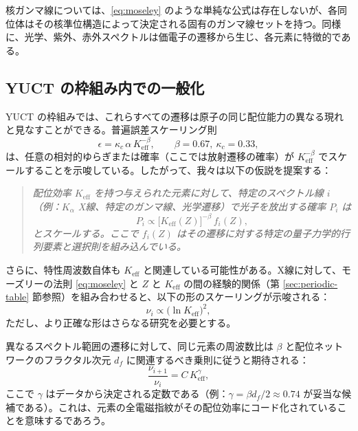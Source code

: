 \documentclass[11pt,a4paper]{article}
\begin{document}
	核ガンマ線については、\eqref{eq:moseley} のような単純な公式は存在しないが、各同位体はその核準位構造によって決定される固有のガンマ線セットを持つ。同様に、光学、紫外、赤外スペクトルは価電子の遷移から生じ、各元素に特徴的である。
	
	\subsection{YUCT の枠組み内での一般化}
	
	YUCT の枠組みでは、これらすべての遷移は原子の同じ配位能力の異なる現れと見なすことができる。普遍誤差スケーリング則
	\begin{equation}
		\epsilon = \kappa_c \, \alpha \, K_{\mathrm{eff}}^{-\beta}, \qquad \beta = 0.67,\ \kappa_c = 0.33,
		\label{eq:universal_law}
	\end{equation}
	は、任意の相対的ゆらぎまたは確率（ここでは放射遷移の確率）が \(K_{\mathrm{eff}}^{-\beta}\) でスケールすることを示唆している。したがって、我々は以下の仮説を提案する：
	
	\begin{quote}
		\emph{配位効率 \(K_{\mathrm{eff}}\) を持つ与えられた元素に対して、特定のスペクトル線 \(i\)（例：\(K_\alpha\) X線、特定のガンマ線、光学遷移）で光子を放出する確率 \(P_i\) は}
		\begin{equation}
			P_i \propto \bigl[K_{\mathrm{eff}}(Z)\bigr]^{-\beta} \, f_i(Z),
			\label{eq:prob_scaling}
		\end{equation}
		\emph{とスケールする。ここで \(f_i(Z)\) はその遷移に対する特定の量子力学的行列要素と選択則を組み込んでいる。}
	\end{quote}
	
	さらに、特性周波数自体も \(K_{\mathrm{eff}}\) と関連している可能性がある。X線に対して、モーズリーの法則 \eqref{eq:moseley} と \(Z\) と \(K_{\mathrm{eff}}\) の間の経験的関係（第 \ref{sec:periodic-table} 節参照）を組み合わせると、以下の形のスケーリングが示唆される：
	\begin{equation}
		\nu_i \propto \bigl(\ln K_{\mathrm{eff}}\bigr)^2,
		\label{eq:freq_scaling}
	\end{equation}
	ただし、より正確な形はさらなる研究を必要とする。
	
	異なるスペクトル範囲の遷移に対して、同じ元素の周波数比は \(\beta\) と配位ネットワークのフラクタル次元 \(d_f\) に関連するべき乗則に従うと期待される：
	\begin{equation}
		\frac{\nu_{i+1}}{\nu_i} = C \, K_{\mathrm{eff}}^{\gamma},
		\label{eq:ratio_scaling}
	\end{equation}
	ここで \(\gamma\) はデータから決定される定数である（例：\(\gamma = \beta d_f/2 \approx 0.74\) が妥当な候補である）。これは、元素の全電磁指紋がその配位効率にコード化されていることを意味するであろう。
	
\end{document}
